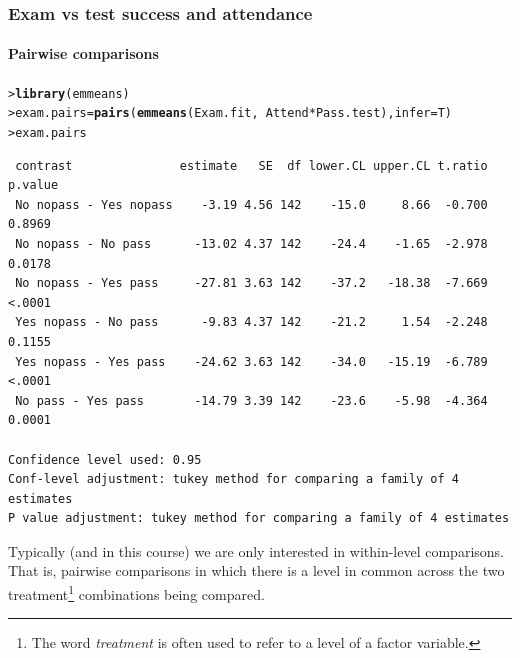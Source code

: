 \documentclass{beamer}\usepackage[]{graphicx}\usepackage[]{xcolor}
\makeatletter
\newcommand{\hlopt}[1]{\textcolor[rgb]{0,0,0}{#1}}%
\newcommand{\hlstd}[1]{\textcolor[rgb]{0.345,0.345,0.345}{#1}}%
\newcommand{\hlkwb}[1]{\textcolor[rgb]{0.69,0.353,0.396}{#1}}%
\newcommand{\hlkwc}[1]{\textcolor[rgb]{0.333,0.667,0.333}{#1}}%
\newcommand{\hlkwd}[1]{\textcolor[rgb]{0.737,0.353,0.396}{\textbf{#1}}}%
\newenvironment{kframe}{%
 \def\at@end@of@kframe{}%
 \ifinner\ifhmode%
  \def\at@end@of@kframe{\end{minipage}}%
  \begin{minipage}{\columnwidth}%
 \fi\fi%
 \def\FrameCommand##1{\hskip\@totalleftmargin \hskip-\fboxsep
 \colorbox{shadecolor}{##1}\hskip-\fboxsep
     \hskip-\linewidth \hskip-\@totalleftmargin \hskip\columnwidth}%
 \MakeFramed {\advance\hsize-\width
   \@totalleftmargin\z@ \linewidth\hsize
   \@setminipage}}%
 {\par\unskip\endMakeFramed%
 \at@end@of@kframe}
\newenvironment{knitrout}{}{} %
\makeatother
\begin{document}
\begin{frame}[fragile]
\frametitle{Exam vs test success and attendance}
\framesubtitle{Pairwise comparisons}

\begin{knitrout}\scriptsize
{}\color{fgcolor}\begin{kframe}
\begin{alltt}
\hlstd{> }\hlkwd{library}\hlstd{(emmeans)}
\hlstd{> }\hlstd{exam.pairs} \hlkwb{=} \hlkwd{pairs}\hlstd{(}\hlkwd{emmeans}\hlstd{(Exam.fit,} \hlopt{~} \hlstd{Attend}\hlopt{*}\hlstd{Pass.test),} \hlkwc{infer}\hlstd{=T)}
\hlstd{> }\hlstd{exam.pairs}
\end{alltt}
\begin{verbatim}
 contrast               estimate   SE  df lower.CL upper.CL t.ratio p.value
 No nopass - Yes nopass    -3.19 4.56 142    -15.0     8.66  -0.700  0.8969
 No nopass - No pass      -13.02 4.37 142    -24.4    -1.65  -2.978  0.0178
 No nopass - Yes pass     -27.81 3.63 142    -37.2   -18.38  -7.669  <.0001
 Yes nopass - No pass      -9.83 4.37 142    -21.2     1.54  -2.248  0.1155
 Yes nopass - Yes pass    -24.62 3.63 142    -34.0   -15.19  -6.789  <.0001
 No pass - Yes pass       -14.79 3.39 142    -23.6    -5.98  -4.364  0.0001

Confidence level used: 0.95 
Conf-level adjustment: tukey method for comparing a family of 4 estimates 
P value adjustment: tukey method for comparing a family of 4 estimates 
\end{verbatim}
\end{kframe}
\end{knitrout}
\bigskip

Typically (and in this course) we are only interested in within-level comparisons. 
That is, pairwise comparisons in which there is a level in common across the two treatment\footnote{The word {\em treatment} is often used to refer to a level of a factor variable.} combinations being compared.

\end{frame}
\end{document}

